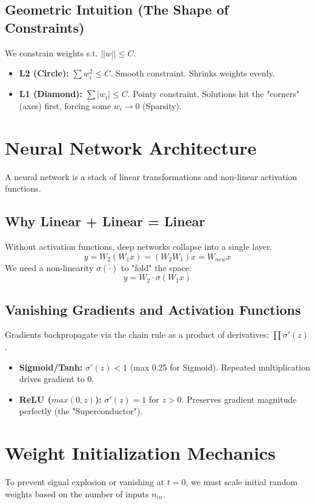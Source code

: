 \documentclass{article}
\begin{document}
\subsection{Geometric Intuition (The Shape of Constraints)}
We constrain weights s.t. $||w|| \le C$.
\begin{itemize}
    \item \textbf{L2 (Circle):} $\sum w_i^2 \le C$. Smooth constraint. Shrinks weights evenly.
    \item \textbf{L1 (Diamond):} $\sum |w_i| \le C$. Pointy constraint. Solutions hit the "corners" (axes) first, forcing some $w_i \to 0$ (Sparsity).
\end{itemize}

\section{Neural Network Architecture}
A neural network is a stack of linear transformations and non-linear activation functions.

\subsection{Why Linear + Linear = Linear}
Without activation functions, deep networks collapse into a single layer.
\begin{equation}
    y = W_2 (W_1 x) = (W_2 W_1) x = W_{new} x
\end{equation}
We need a non-linearity $\sigma(\cdot)$ to "fold" the space:
\begin{equation}
    y = W_2 \cdot \sigma(W_1 x)
\end{equation}

\subsection{Vanishing Gradients and Activation Functions}
Gradients backpropagate via the chain rule as a product of derivatives: $\prod \sigma'(z)$.
\begin{itemize}
    \item \textbf{Sigmoid/Tanh:} $\sigma'(z) < 1$ (max 0.25 for Sigmoid). Repeated multiplication drives gradient to 0.
    \item \textbf{ReLU ($max(0, z)$):} $\sigma'(z) = 1$ for $z>0$. Preserves gradient magnitude perfectly (the "Superconductor").
\end{itemize}

\section{Weight Initialization Mechanics}
To prevent signal explosion or vanishing at $t=0$, we must scale initial random weights based on the number of inputs $n_{in}$.
\end{document}
